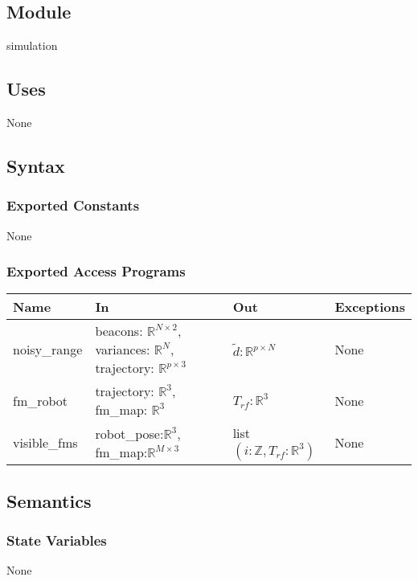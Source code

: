 \documentclass[12pt, titlepage]{article}
\begin{document}

\subsection{Module}

simulation

\subsection{Uses}
None

\subsection{Syntax}

\subsubsection{Exported Constants}
None
\subsubsection{Exported Access Programs}

\begin{center}
  \begin{tabular}{p{3cm} p{5.5cm} p{2.5cm} p{3cm}}
  \hline
  \textbf{Name} & \textbf{In} & \textbf{Out} & \textbf{Exceptions} \\
  \hline
  noisy\_range & 
  beacons: $\mathbb{R}^{N \times 2}$, 
  variances: $\mathbb{R}^N$, 
  trajectory: $\mathbb{R}^{p \times 3}$ & 
  $\tilde{d}: \mathbb{R}^{p \times N}$ & 
  None \\
  
  fm\_robot & 
  trajectory: $\mathbb{R}^3$, 
  fm\_map: $\mathbb{R}^3$ & 
  $T_{rf} : \mathbb{R}^3$ & 
  None \\
  
  visible\_fms & 
  robot\_pose:$\mathbb{R}^3$, 
  fm\_map:$\mathbb{R}^{M \times 3}$ & 
  list $(i: \mathbb{Z}, T_{rf}:\mathbb{R}^3)$ & 
  None \\
  \hline
  \end{tabular}
  \end{center}
  

\subsection{Semantics}

\subsubsection{State Variables}
None
\end{document}
